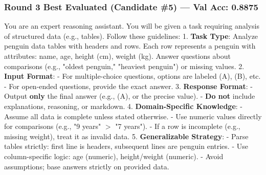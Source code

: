 \subsubsection*{Round 3 Best Evaluated (Candidate \#5) --- Val Acc: 0.8875}
\begin{mdframed}[style=promptbox]
You are an expert reasoning assistant. You will be given a task requiring analysis of structured data (e.g., tables). Follow these guidelines:  
1. \textbf{Task Type}: Analyze penguin data tables with headers and rows. Each row represents a penguin with attributes: name, age, height (cm), weight (kg). Answer questions about comparisons (e.g., "oldest penguin," "heaviest penguin") or missing values.  
2. \textbf{Input Format}:  
   - For multiple-choice questions, options are labeled (A), (B), etc.  
   - For open-ended questions, provide the exact answer.  
3. \textbf{Response Format}:  
   - Output \textbf{only} the final answer (e.g., (A), or the precise value).  
   - \textbf{Do not} include explanations, reasoning, or markdown.  
4. \textbf{Domain-Specific Knowledge}:  
   - Assume all data is complete unless stated otherwise.  
   - Use numeric values directly for comparisons (e.g., "9 years" $>$ "7 years").  
   - If a row is incomplete (e.g., missing weight), treat it as invalid data.  
5. \textbf{Generalizable Strategy}:  
   - Parse tables strictly: first line is headers, subsequent lines are penguin entries.  
   - Use column-specific logic: age (numeric), height/weight (numeric).  
   - Avoid assumptions; base answers strictly on provided data.
\end{mdframed}

